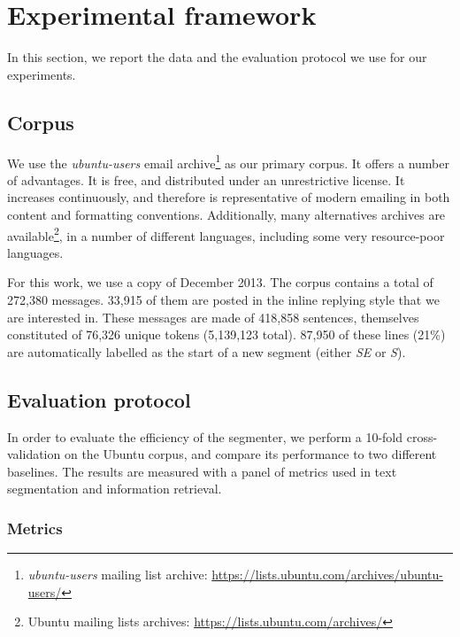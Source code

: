 \section{Experimental framework}

In this section, we report the data and the evaluation protocol we use for our experiments.
\subsection{Corpus}

We use the \textit{ubuntu-users} email archive\footnote{\textit{ubuntu-users} mailing list archive: \url{https://lists.ubuntu.com/archives/ubuntu-users/}} as our primary corpus. It offers a number of advantages. It is free, and distributed under an unrestrictive license. It increases continuously, and therefore is representative of modern emailing in both content and formatting conventions. Additionally, many alternatives archives are available\footnote{Ubuntu mailing lists archives: \url{https://lists.ubuntu.com/archives/}}, in a number of different languages, including some very resource-poor languages.

For this work, we use a copy of December 2013.
The corpus contains a total of 272,380 messages. 33,915 of them are posted in the inline replying style that we are interested in. These messages are made of 418,858 sentences, themselves constituted of 76,326 unique tokens (5,139,123 total). 87,950 of these lines (21\%) are automatically labelled as the start of a new segment (either \textit{SE} or \textit{S}).
\subsection{Evaluation protocol}

In order to evaluate the efficiency of the segmenter, we perform a 10-fold cross-validation on the Ubuntu corpus, and compare its performance to two different baselines. The results are measured with a panel of metrics used in text segmentation and information retrieval.
\subsubsection{Metrics}

